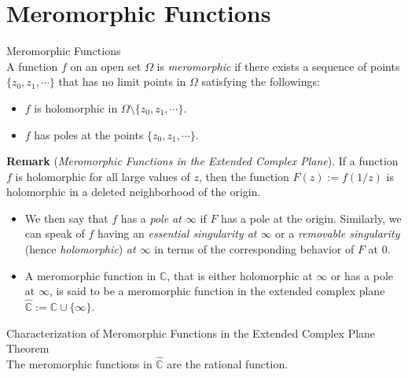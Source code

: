 \section{Meromorphic Functions}

\begin{definition}{Meromorphic Functions}\\
A function $f$ on an open set $\Omega$ is \textit{meromorphic} if there exists a sequence of points $\{z_0,z_1 ,\cdots\}$ that has no limit points in $\Omega$ satisfying the followings:
\begin{itemize}
    \item $f$ is holomorphic in $\Omega \setminus \{z_0 ,z_1 ,\cdots\}$.
    \item $f$ has poles at the points $\{z_0 ,z_1,\cdots\}$.
\end{itemize}
\end{definition}

\noindent\textbf{Remark} (\textit{Meromorphic Functions in the Extended Complex Plane}). If a function $f$ is holomorphic for all large values of $z$, then the function $F(z):= f(1/z)$ is holomorphic in a deleted neighborhood of the origin.
\begin{itemize}
    \item We then say that $f$ has a \textit{pole at $\infty$} if $F$ has a pole at the origin. Similarly, we can speak of $f$ having an \textit{essential singularity at $\infty$} or a \textit{removable singularity} (hence \textit{holomorphic}) \textit{at $\infty$} in terms of the corresponding behavior of $F$ at $0$.

    \item A meromorphic function in $\mathbb{C}$, that is either holomorphic at $\infty$ or has a pole at $\infty$, is said to be a meromorphic function in the extended complex plane $\widehat{\mathbb{C}}:= \mathbb{C} \cup \{\infty\}$.
\end{itemize}

\begin{theorem}{Characterization of Meromorphic Functions in the Extended Complex Plane Theorem}\\
The meromorphic functions in $\widehat{\mathbb{C}}$ are the rational function.
\end{theorem}

